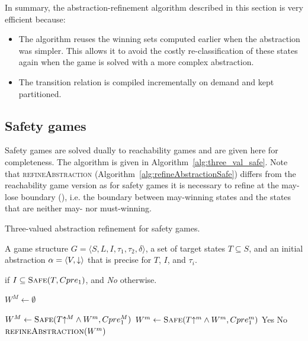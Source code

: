 In summary, the abstraction-refinement algorithm described in this section is very efficient because:
\begin{itemize}
    \item The algorithm reuses the winning sets computed earlier when the abstraction was simpler. This allows it to avoid the costly re-classification of these states again when the game is solved with a more complex abstraction.
    \item The transition relation is compiled incrementally on demand and kept partitioned. 
\end{itemize}

\subsection{Safety games}

Safety games are solved dually to reachability games and are given here for completeness. The algorithm is given in Algorithm~\ref{alg:three_val_safe}. Note that \textsc{refineAbstraction} (Algorithm~\ref{alg:refineAbstractionSafe}) differs from the reachability game version as for safety games it is necessary to refine at the may-lose boundary (\cite{Alfaro_Roy_07}), i.e. the boundary between may-winning states and the states that are neither may- nor must-winning.

\begin{algorithm}
\caption{Three-valued abstraction refinement for safety games.}
\label{alg:three_val_safe}

\begin{algorithmic}[1]

\Require A game structure $G = \langle S, L, I, \tau_1, \tau_2, \delta \rangle$, a set 
of target states $T\subseteq S$, and an initial abstraction $\alpha=\langle V, \mathord{\downarrow} \rangle$
that is precise for $T$, $I$, and $\tau_i$.

 if $I \subseteq \textsc{Safe}(T, Cpre_1)$, and {\it No} otherwise.

    \State $W^M \gets \emptyset$

    \Loop
        \State $W^M \gets \textsc{Safe}(T\mathord{\uparrow^M} \wedge W^m, Cpre_1^M)$
        \State $W^m \gets \textsc{Safe}(T\mathord{\uparrow^m} \wedge W^m, Cpre_1^m)$
            \State\Return Yes
            \State\Return No
        \Else       
            \State$\Call{refineAbstraction}{W^m}$
        \EndIf
    \EndLoop
\EndFunction

\end{algorithmic}
\end{algorithm}

